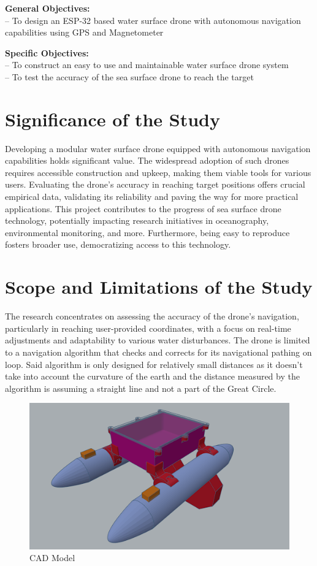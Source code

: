 {\bf General Objectives:} \\
\indent -- To design an ESP-32 based water surface drone with autonomous navigation capabilities using GPS and Magnetometer

{\bf Specific Objectives:} \\
\indent -- To construct an easy to use and maintainable water surface drone system \\
\indent -- To test the accuracy of the sea surface drone to reach the target 

\section{Significance of the Study}
Developing a modular water surface drone equipped with autonomous navigation capabilities holds significant value. The widespread adoption of
such drones requires accessible construction and upkeep, making them viable tools for various users. Evaluating the drone's accuracy in reaching
target positions offers crucial empirical data, validating its reliability and paving the way for more practical applications. This project 
contributes to the progress of sea surface drone technology, potentially impacting research initiatives in oceanography, environmental monitoring, 
and more. Furthermore, being easy to reproduce fosters broader use, democratizing access to this technology.

\section{Scope and Limitations of the Study}
The research concentrates on assessing the accuracy of the drone's navigation, particularly in reaching user-provided coordinates, with a focus
on real-time adjustments and adaptability to various water disturbances.  The drone is limited to a navigation algorithm that checks and corrects
for its navigational pathing on loop. Said algorithm is only designed for relatively small distances as it doesn't take into account the curvature 
of the earth and the distance measured by the algorithm is assuming a straight line and not a part of the Great Circle.

\vspace{0.5cm}
\begin{figure}[ht]
\centering
\includegraphics[scale = 0.60]{assets/3d_model_complete.png}
\caption{CAD Model}
\label{fig:3dModelComplete}
\end{figure}


